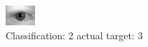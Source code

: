 \begin{figure}[h!]
\begin{center}
\includegraphics[width=0.60\columnwidth]{figures/ID616_class_2_target_3.png}
\end{center}
\caption{ Classification: 2 actual target: 3}
\label{fig:ID616_class_2_target_3}
\end{figure}
